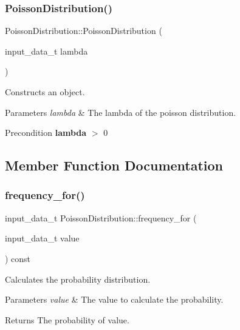 \subsubsection{\texorpdfstring{Poisson\+Distribution()}{PoissonDistribution()}}
{\footnotesize\ttfamily Poisson\+Distribution\+::\+Poisson\+Distribution (\begin{DoxyParamCaption}\item[{input\+\_\+data\+\_\+t}]{lambda }\end{DoxyParamCaption})\hspace{0.3cm}{\ttfamily [inline]}}

Constructs an object. 
\begin{DoxyParams}{Parameters}
{\em lambda} & The lambda of the poisson distribution. \\
\hline
\end{DoxyParams}
\begin{DoxyPrecond}{Precondition}
{\bfseries lambda} $>$ 0 
\end{DoxyPrecond}


\subsection{Member Function Documentation}
\mbox{\label{classPoissonDistribution_ae3eb709210bb2dcae5f41c6fdccede44}} 
\subsubsection{\texorpdfstring{frequency\+\_\+for()}{frequency\_for()}}
{\footnotesize\ttfamily input\+\_\+data\+\_\+t Poisson\+Distribution\+::frequency\+\_\+for (\begin{DoxyParamCaption}\item[{input\+\_\+data\+\_\+t}]{value }\end{DoxyParamCaption}) const\hspace{0.3cm}{\ttfamily [virtual]}}

Calculates the probability distribution. 
\begin{DoxyParams}{Parameters}
{\em value} & The value to calculate the probability. \\
\hline
\end{DoxyParams}
\begin{DoxyReturn}{Returns}
The probability of value. 
\end{DoxyReturn}


